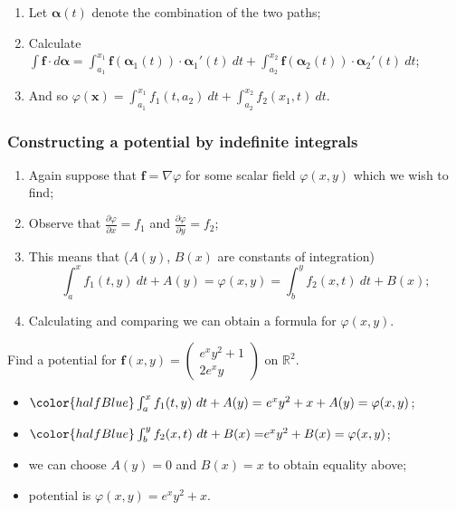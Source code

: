 \documentclass[aspectratio=169,handout]{beamer}
\newcommand{\bR}{\mathbb{R}} %
\newcommand{\ff}{\mathbf{f}}
\newcommand{\xx}{\mathbf{x}}
\newcommand{\aalpha}{\boldsymbol{\alpha}}
\begin{document}
\begin{frame}
\begin{columns}
\begin{column}{.5\textwidth}
        \end{column}
    \end{columns}


    \begin{enumerate}
        \item[4.] Let \(\aalpha(t)\) denote the combination of the two paths;
        \item[5.] Calculate \(\int \ff \cdot d\aalpha = \int_{a_1}^{x_1} \ff(\aalpha_1(t))\cdot \aalpha_1'(t) \ dt +  \int_{a_2}^{x_2} \ff(\aalpha_2(t))\cdot \aalpha_2'(t) \ dt \);
        \item[6.] And so \(\varphi(\xx)  = \int_{a_1}^{x_1} f_1(t,a_2)\ dt + \int_{a_2}^{x_2} f_2(x_1,t)\ dt \).
    \end{enumerate}

\end{frame}

\begin{frame}
    \frametitle{Constructing a potential by indefinite integrals}

    \begin{enumerate}
        \item Again suppose that \(\ff = \nabla \varphi\) for some scalar field \(\varphi(x,y)\) which we wish to find;
        \item Observe that \(\frac{\partial \varphi}{\partial x} = f_1\) and  \(\frac{\partial \varphi}{\partial y} = f_2\);
        \item  This means that (\(A(y)\), \(B(x)\) are constants of integration)
        \[
            \int_{a}^{x} f_1(t,y) \ dt + A(y) = \varphi(x,y) =  \int_{b}^{y} f_2(x,t) \ dt + B(x); 
        \]
        \item Calculating and comparing we can obtain a formula for \(\varphi(x,y)\).
    \end{enumerate}
    

    \begin{example}
        Find a potential for \(\ff(x,y) = \left(\begin{smallmatrix}
            e^x y^2 + 1\\ 2e^x y
        \end{smallmatrix}\right)\) on \(\bR^2\).
        \begin{itemize}
            \item \({\color{halfBlue} \int_{a}^{x} f_1(t,y) \ dt + A(y) = } \ e^x y^2 + x + A(y) = \varphi(x,y)\);
            \item \( {\color{halfBlue} \int_{b}^{y} f_2(x,t) \ dt + B(x) = }  e^x y^2 + B(x) = \varphi(x,y) \);
            \item we can choose \(A(y) = 0\) and \(B(x)=x\) to obtain equality above;
            \item potential is \(\varphi(x,y) = e^x y^2 + x\).
        \end{itemize}
    \end{example}

\end{frame}
\end{document}
